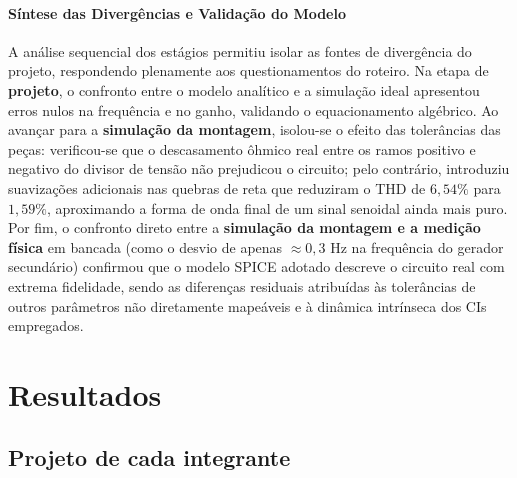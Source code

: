 \documentclass[11pt,a4paper]{article}
\begin{document}
\paragraph{Síntese das Divergências e Validação do Modelo}
A análise sequencial dos estágios permitiu isolar as fontes de divergência do projeto, respondendo plenamente aos questionamentos do roteiro. Na etapa de \textbf{projeto}, o confronto entre o modelo analítico e a simulação ideal apresentou erros nulos na frequência e no ganho, validando o equacionamento algébrico. Ao avançar para a \textbf{simulação da montagem}, isolou-se o efeito das tolerâncias das peças: verificou-se que o descasamento ôhmico real entre os ramos positivo e negativo do divisor de tensão não prejudicou o circuito; pelo contrário, introduziu suavizações adicionais nas quebras de reta que reduziram o THD de $6{,}54\%$ para $1{,}59\%$, aproximando a forma de onda final de um sinal senoidal ainda mais puro. Por fim, o confronto direto entre a \textbf{simulação da montagem e a medição física} em bancada (como o desvio de apenas $\approx 0{,}3\text{ Hz}$ na frequência do gerador secundário) confirmou que o modelo SPICE adotado descreve o circuito real com extrema fidelidade, sendo as diferenças residuais atribuídas às tolerâncias de outros parâmetros não diretamente mapeáveis e à dinâmica intrínseca dos CIs empregados.


\section{Resultados}



\subsection{Projeto de cada integrante}
\end{document}
